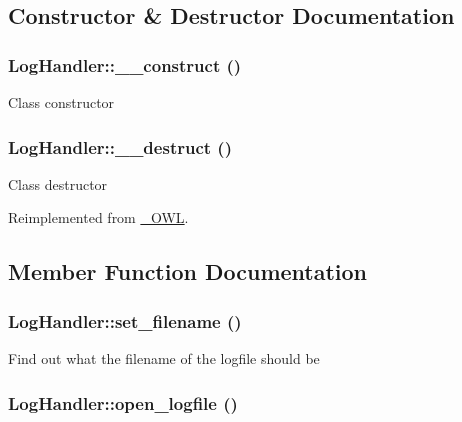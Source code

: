 \subsection{Constructor \& Destructor Documentation}
\hypertarget{classLogHandler_acca49c4394109f4ccc494048a0b2cab}{
\subsubsection{\setlength{\rightskip}{0pt plus 5cm}LogHandler::\_\-\_\-construct ()}}
\label{classLogHandler_acca49c4394109f4ccc494048a0b2cab}


Class constructor \hypertarget{classLogHandler_acd0c653489cf221423b9edd62e81458}{
\subsubsection{\setlength{\rightskip}{0pt plus 5cm}LogHandler::\_\-\_\-destruct ()}}
\label{classLogHandler_acd0c653489cf221423b9edd62e81458}


Class destructor 

Reimplemented from \hyperlink{class__OWL_44fd2222476a3109286cc82d92b6bbcc}{\_\-OWL}.

\subsection{Member Function Documentation}
\hypertarget{classLogHandler_65ef4f1c6ab4cff4057f5f5932cc690e}{
\subsubsection{\setlength{\rightskip}{0pt plus 5cm}LogHandler::set\_\-filename ()}}
\label{classLogHandler_65ef4f1c6ab4cff4057f5f5932cc690e}


Find out what the filename of the logfile should be \hypertarget{classLogHandler_af324e5156bf8ea83e5b4e990ea99e2d}{
\subsubsection{\setlength{\rightskip}{0pt plus 5cm}LogHandler::open\_\-logfile ()}}
\label{classLogHandler_af324e5156bf8ea83e5b4e990ea99e2d}


